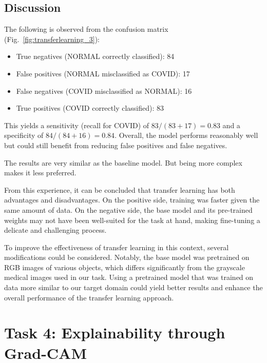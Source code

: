 \documentclass[conference]{IEEEtran}
\begin{document}
\subsection{Discussion}
The following is observed from the confusion matrix (Fig.~\ref{fig:transferlearning_3}):

\begin{itemize}
	\item True negatives (NORMAL correctly classified): 84
	\item False positives (NORMAL misclassified as COVID): 17
	\item False negatives (COVID misclassified as NORMAL): 16
	\item True positives (COVID correctly classified): 83
\end{itemize}
\vspace{0.5cm}

This yields a sensitivity (recall for COVID) of $83/(83+17)=0.83$ and a specificity of $84/(84+16)=0.84$. Overall, the model performs reasonably well but could still benefit from reducing false positives and false negatives. 

The results are very similar as the baseline model. But being more complex makes it less preferred.

From this experience, it can be concluded that transfer learning has both advantages and disadvantages. On the positive side, training was faster given the same amount of data. On the negative side, the base model and its pre-trained weights may not have been well-suited for the task at hand, making fine-tuning a delicate and challenging process.

To improve the effectiveness of transfer learning in this context, several modifications could be considered. Notably, the base model was pretrained on RGB images of various objects, which differs significantly from the grayscale medical images used in our task. Using a pretrained model that was trained on data more similar to our target domain could yield better results and enhance the overall performance of the transfer learning approach.

\section{Task 4: Explainability through Grad-CAM} \label{sec:task_4}
\end{document}
